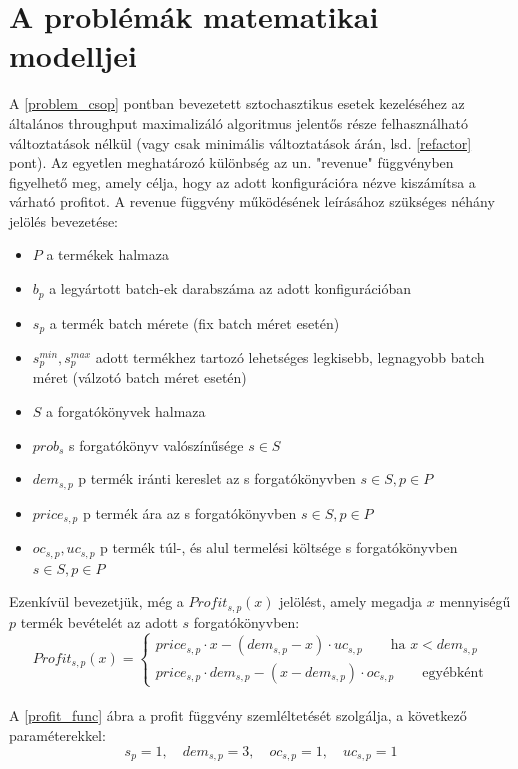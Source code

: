 \documentclass [12pt]{report}
\begin{document}
\section{A problémák matematikai modelljei} \label{math_modells}
A \ref{problem_csop} pontban bevezetett sztochasztikus esetek kezeléséhez az általános throughput maximalizáló algoritmus jelentős része felhasználható változtatások nélkül (vagy csak minimális változtatások árán, lsd. \ref{refactor} pont). Az egyetlen meghatározó különbség az un. "revenue" függvényben figyelhető meg, amely célja, hogy az adott konfigurációra nézve kiszámítsa a várható profitot. A revenue függvény működésének leírásához szükséges néhány jelölés bevezetése:
\begin {itemize}
\item[] $P$ a termékek halmaza
\item[] $b_p$ a legyártott batch-ek darabszáma az adott konfigurációban
\item[] $s_p$ a termék batch mérete (fix batch méret esetén)
\item[] $s_p^{min},s_p^{max}$ adott termékhez tartozó lehetséges legkisebb, legnagyobb batch méret (válzotó batch méret esetén)
\item[] $S$ a forgatókönyvek halmaza
\item[] $prob_s$ s forgatókönyv valószínűsége $s	\in S$
\item[] $dem_{s,p}$ p termék iránti kereslet az s forgatókönyvben $s	\in S, p	\in P$
\item[] $price_{s,p}$ p termék ára az s forgatókönyvben $s	\in S, p	\in P$
\item[] $oc_{s,p}, uc_{s,p}$ p termék túl-, és alul termelési költsége s forgatókönyvben $s	\in S, p	\in P$
\end {itemize}
Ezenkívül bevezetjük, még a $Profit_{s,p}(x)$ jelölést, amely megadja $x$ mennyiségű $p$ termék bevételét az adott $s$ forgatókönyvben:
\begin{equation*}
Profit_{s,p}(x)= \begin{cases}
            price_{s,p}\cdot x-(dem_{s,p}-x) \cdot uc_{s,p}\qquad \text{ha } x<dem_{s,p} \\
            price_{s,p} \cdot dem_{s,p}-(x-dem_{s,p}) \cdot oc_{s,p}\qquad \text{egyébként}
       \end{cases}
\end{equation*}\\
A \ref{profit_func} ábra a profit függvény szemléltetését szolgálja, a következő paraméterekkel:
$$s_p=1,\quad dem_{s,p}=3, \quad oc_{s,p}=1, \quad  uc_{s,p}=1$$\\
\end{document}
